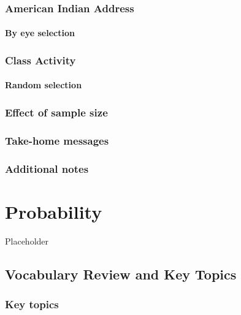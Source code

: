 \documentclass[
]{report}
\begin{document}
\subsection{American Indian Address}\label{american-indian-address}

\subsubsection*{By eye selection}\label{by-eye-selection}

\subsection{Class Activity}\label{class-activity}

\subsubsection*{Random selection}\label{random-selection}

\subsection*{Effect of sample size}\label{effect-of-sample-size}

\subsection{Take-home messages}\label{take-home-messages-2}

\subsection{Additional notes}\label{additional-notes-2}

\chapter{Probability}\label{probability}

Placeholder

\section{Vocabulary Review and Key Topics}\label{vocabulary-review-and-key-topics-1}

\subsection{Key topics}\label{key-topics-1}
\end{document}
